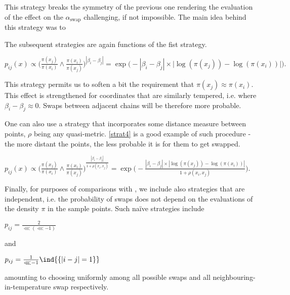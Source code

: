 This strategy breaks the symmetry of the previous one rendering the evaluation of the effect on the $\alpha_\text{swap}$ challenging, if not impossible. The main idea behind this strategy was to  


The subsequent strategies are again functions of the fist strategy.

\begin{strategy}[resume]
	\item 
		$p_{ij}(x) \propto 
			\Big( \frac{\pi (x_j)}{\pi( x_i )} \wedge 
			\frac{\pi (	x_i)}{\pi( x_j )} \Big)^{|\beta_i - \beta_j|} = 
		\exp \Big( - |\beta_i - \beta_j| \times \big| \log ( \pi(x_j) ) - \log ( \pi(x_i) ) \big| \Big).$\label{strat3} 
\end{strategy}

This strategy permits us to soften a bit the requirement that $\pi(x_j) \approx \pi (x_i)$. This effect is strengthened for coordinates that are similarly tempered, i.e. where $\beta_i - \beta_j \approx 0$. Swaps between adjacent chains will be therefore more probable. 

One can also use a strategy that incorporates some distance measure between points, $\rho$ being any quasi-metric. \ref{strat4} is a good example of such procedure - the more distant the points, the less probable it is for them to get swapped.  

\begin{strategy}[resume]
	\item 
		$p_{ij}(x) \propto \Big( \frac{\pi (x_j)}{\pi( x_i )} \wedge \frac{\pi (x_i)}{\pi( x_j )} \Big)^\frac{|\beta_i - \beta_j|}{1 + \rho(x_i, x_j)} = \exp \Big( - \frac{|\beta_i - \beta_j| \times | \log ( \pi(x_j) ) - \log ( \pi(x_i) ) |}{{1 + \rho(x_i, x_j)}} \Big).$\label{strat4}
\end{strategy} 

Finally, for purposes of comparisons with \citet{BaragattiParallelTemperingWithEquiEnergyMoves}, we include also strategies that are \sspace\, independent, i.e. the probability of swaps does not depend on the evaluations of the density $\pi$ in the sample points. Such na\"ive strategies include 

\begin{strategy}[resume]
	\item $p_{ij} = \frac{2}{\lll (\lll - 1)}$\label{strat5}
\end{strategy}

and 

\begin{strategy}[resume]
	\item $p_{ij} = \frac{1}{\lll - 1} \ind{\{|i-j|=1\}}$\label{strat6}
\end{strategy}

amounting to choosing uniformly among all possible swaps and all neighbouring-in-temperature swap respectively. 